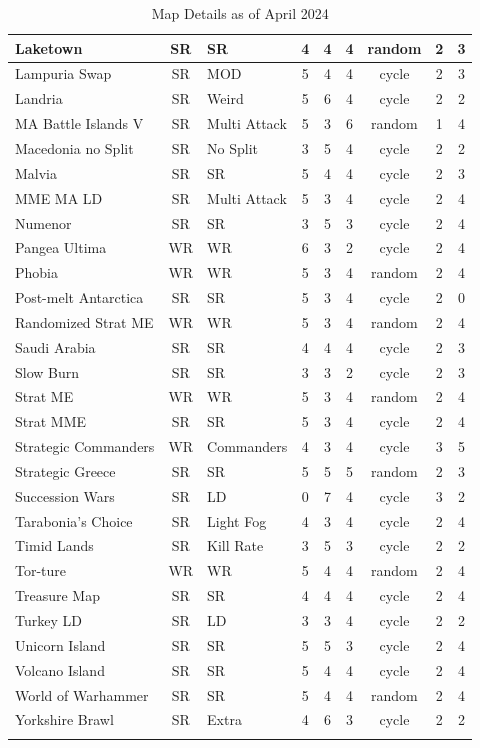\begin{longtable}{|p{2.5cm}|c|p{1.5cm}|c|c|c|c|c|c|}
Laketown & SR & SR & 4 & 4 & 4 & random & 2 & 3 \\ \hline
Lampuria Swap & SR & MOD & 5 & 4 & 4 & cycle & 2 & 3 \\ \hline
Landria & SR & Weird & 5 & 6 & 4 & cycle & 2 & 2 \\ \hline
\rowcolor{Light_Blue}
MA Battle Islands V & SR & Multi Attack & 5 & 3 & 6 & random & 1 & 4 \\ \hline
Macedonia no Split & SR & No Split & 3 & 5 & 4 & cycle & 2 & 2 \\ \hline
Malvia & SR & SR & 5 & 4 & 4 & cycle & 2 & 3 \\ \hline
MME MA LD & SR & Multi Attack & 5 & 3 & 4 & cycle & 2 & 4 \\ \hline
Numenor & SR & SR & 3 & 5 & 3 & cycle & 2 & 4 \\ \hline
Pangea Ultima & WR & WR & 6 & 3 & 2 & cycle & 2 & 4 \\ \hline
\rowcolor{Light_Blue}
Phobia & WR & WR & 5 & 3 & 4 & random & 2 & 4 \\ \hline
Post-melt Antarctica & SR & SR & 5 & 3 & 4 & cycle & 2 & 0 \\ \hline
\rowcolor{Light_Blue}
Randomized Strat ME & WR & WR & 5 & 3 & 4 & random & 2 & 4 \\ \hline
Saudi Arabia & SR & SR & 4 & 4 & 4 & cycle & 2 & 3 \\ \hline
Slow Burn & SR & SR & 3 & 3 & 2 & cycle & 2 & 3 \\ \hline
\rowcolor{Light_Blue}
Strat ME & WR & WR & 5 & 3 & 4 & random & 2 & 4 \\ \hline
Strat MME & SR & SR & 5 & 3 & 4 & cycle & 2 & 4 \\ \hline
Strategic Commanders & WR & Commanders & 4 & 3 & 4 & cycle & 3 & 5 \\ \hline
\rowcolor{Light_Blue}
Strategic Greece & SR & SR & 5 & 5 & 5 & random & 2 & 3 \\ \hline
Succession Wars & SR & LD & 0 & 7 & 4 & cycle & 3 & 2 \\ \hline
Tarabonia's Choice & SR & Light Fog & 4 & 3 & 4 & cycle & 2 & 4 \\ \hline
Timid Lands & SR & Kill Rate & 3 & 5 & 3 & cycle & 2 & 2 \\ \hline
\rowcolor{Light_Blue}
Tor-ture & WR & WR & 5 & 4 & 4 & random & 2 & 4 \\ \hline
Treasure Map & SR & SR & 4 & 4 & 4 & cycle & 2 & 4 \\ \hline
Turkey LD & SR & LD & 3 & 3 & 4 & cycle & 2 & 2 \\ \hline
Unicorn Island & SR & SR & 5 & 5 & 3 & cycle & 2 & 4 \\ \hline
Volcano Island & SR & SR & 5 & 4 & 4 & cycle & 2 & 4 \\ \hline
\rowcolor{Light_Blue}
World of Warhammer & SR & SR & 5 & 4 & 4 & random & 2 & 4 \\ \hline
Yorkshire Brawl & SR & Extra & 4 & 6 & 3 & cycle & 2 & 2 \\ \hline

\caption{Map Details as of April 2024}
\label{tab:map-details}
\end{longtable}

